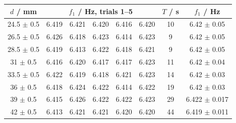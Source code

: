 \begin{tabular}{@{}cccccccc@{}}
\toprule
$d$ / mm & \multicolumn{5}{c}{$f_1$ / Hz, trials 1--5} & $T$ / s & $f_1$ / Hz \\
\midrule
24.5 $\pm$ 0.5 & 6.419 & 6.421 & 6.420 & 6.416 & 6.420 & 10 & 6.42 $\pm$ 0.05 \\
26.5 $\pm$ 0.5 & 6.426 & 6.418 & 6.423 & 6.414 & 6.423 & 9 & 6.42 $\pm$ 0.05 \\
28.5 $\pm$ 0.5 & 6.419 & 6.413 & 6.422 & 6.418 & 6.421 & 9 & 6.42 $\pm$ 0.05 \\
31 $\pm$ 0.5 & 6.416 & 6.420 & 6.417 & 6.417 & 6.423 & 11 & 6.42 $\pm$ 0.04 \\
33.5 $\pm$ 0.5 & 6.422 & 6.419 & 6.418 & 6.421 & 6.423 & 14 & 6.42 $\pm$ 0.03 \\
36 $\pm$ 0.5 & 6.418 & 6.424 & 6.422 & 6.414 & 6.422 & 19 & 6.42 $\pm$ 0.03 \\
39 $\pm$ 0.5 & 6.415 & 6.426 & 6.422 & 6.422 & 6.423 & 29 & 6.422 $\pm$ 0.017 \\
42 $\pm$ 0.5 & 6.413 & 6.421 & 6.421 & 6.420 & 6.420 & 44 & 6.419 $\pm$ 0.011 \\
\bottomrule
\end{tabular}